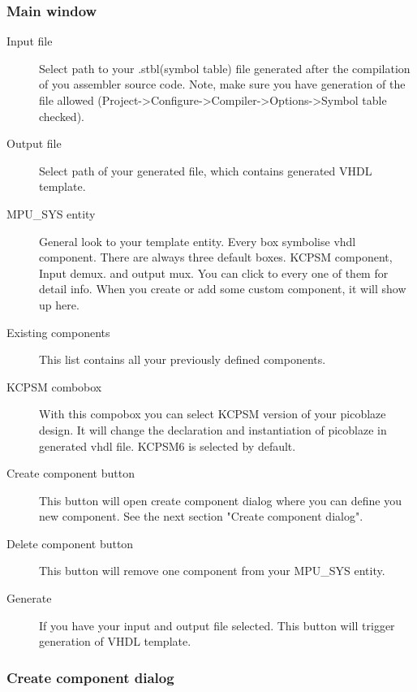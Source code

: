\subsubsection{Main window}
    \begin{description}
        \item [Input file]
            Select path to your .stbl(symbol table) file generated after the compilation of you assembler source code. Note, make sure you
            have generation of the file allowed (Project->Configure->Compiler->Options->Symbol table checked).
        \item [Output file]
            Select path of your generated file, which contains generated VHDL template.
        \item [MPU\_SYS entity]
            General look to your template entity. Every box symbolise vhdl component. There are always three default boxes. KCPSM component, Input demux.
            and output mux. You can click to every one of them for detail info. When you create or add some custom component, it will show
            up here.
        \item [Existing components]
            This list contains all your previously defined components.
        \item [KCPSM combobox]
            With this compobox you can select KCPSM version of your picoblaze design. It will change the declaration and instantiation of picoblaze
            in generated vhdl file. KCPSM6 is selected by default.
        \item [Create component button]
            This button will open create component dialog where you can define you new component. See the next section "Create component dialog".
        \item [Delete component button]
            This button will remove one component from your MPU\_SYS entity.
        \item [Generate]
            If you have your input and output file selected. This button will trigger generation of VHDL template.
    \end{description}

\subsubsection{Create component dialog}




